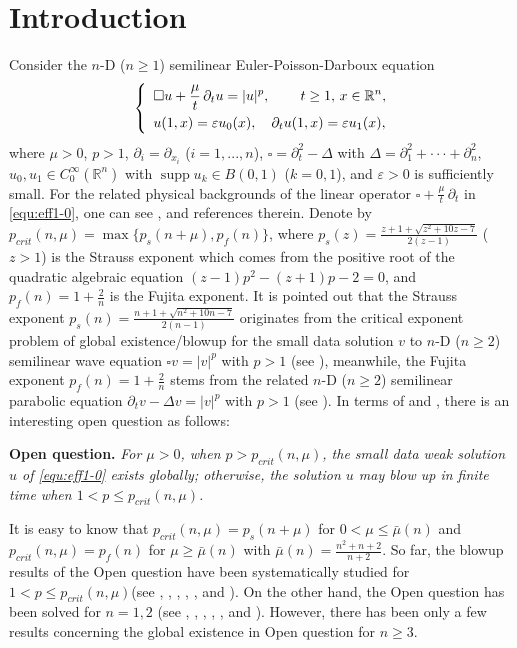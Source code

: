 \documentclass[11pt,twoside]{article}
\newcommand{\R}{\mathbb R}
\newcommand{\p}{\partial}
\newcommand{\ve}{\varepsilon}
\newcommand{\f}{\frac}
\theoremstyle{plain}
\theoremstyle{definition}
\theoremstyle{remark}
\numberwithin{equation}{section}
\begin{document}
\section{Introduction}
Consider  the $n$-D ($n\ge1$) semilinear Euler-Poisson-Darboux equation
\begin{equation}\label{equ:eff1-0}
\left\{ \enspace
\begin{aligned}
&\square u+\f{\mu}{t}\,\p_tu=|u|^p, \,\qquad t\geq1,\, x\in\Bbb R^n,\\
&u(1,x)=\ve u_0(x), \quad \partial_{t} u(1,x)=\ve u_1(x),
\end{aligned}
\right.
\end{equation}
where $\mu>0$,  $p>1$,
$\p_i=\p_{x_i}$ ($i=1, ..., n$), $\square=\partial_t^2-\Delta$ with $\Delta=\p_1^2+\cdot\cdot\cdot+\p_n^2$, $u_0, u_1\in
C_0^{\infty}(\R^n)$ with $\operatorname{supp} u_k\in B(0, 1)$  ($k=0, 1$), and $\ve>0$ is sufficiently small.
For the related physical backgrounds of the linear operator $\square +\f{\mu}{t}\,\p_t$ in \eqref{equ:eff1-0},
one can see \cite{DA-0}, \cite{LWY} and  references therein.
Denote by $p_{crit}(n,\mu)=\max\{p_s(n+\mu), p_f(n)\}$,
where  $p_s(z)=\f{z+1+\sqrt{z^2+10z-7}}{2(z-1)}$ ($z>1$)
is the Strauss exponent which comes from the positive root of the quadratic algebraic equation
$(z-1)p^2-(z+1)p-2=0$, and $p_f(n)=1+\f{2}{n}$ is the Fujita exponent.
It is pointed out that the Strauss exponent $p_s(n)=\f{n+1+\sqrt{n^2+10n-7}}{2(n-1)}$
originates from the  critical exponent problem of  global existence/blowup for the small data solution $v$ to $n$-D ($n\ge 2$)
semilinear wave equation
$\square v=|v|^p$ with $p>1$ (see \cite{Strauss}), meanwhile, the Fujita exponent $p_f(n)=1+\f{2}{n}$ stems from
the related $n$-D ($n\ge 2$) semilinear parabolic equation  $\partial_t v-\Delta v=|v|^p$ with $p>1$ (see \cite{Fuj}).
In terms of \cite{Rei1} and \cite{Imai}, there is an interesting open question as follows:

{\bf Open question.} {\it For $\mu>0$, when $p>p_{crit}(n,\mu)$, the small data weak solution $u$
of \eqref{equ:eff1-0} exists globally; otherwise, the solution $u$ may blow up in finite time when $1<p\le p_{crit}(n,\mu)$.
}

It is easy to know that $p_{crit}(n,\mu)=p_s(n+\mu)$ for $0<\mu\le\bar \mu(n)$ and
$p_{crit}(n,\mu)=p_f(n)$ for $\mu\ge\bar\mu(n)$ with $\bar\mu(n)=\frac{n^2+n+2}{n+2}$.
So far, the blowup results of the Open question have been systematically studied for $1<p\leq p_{crit}(n, \mu)$(see \cite{FLT}, \cite{IS},
\cite{LTW}, \cite{PR-0}, \cite{PR}, \cite{TL2} and \cite{W1}). On the other hand, the Open question has been solved for $n=1,2$ (see \cite{DA-0}, \cite{LWY},
\cite{HLY}, \cite{LY}, \cite{LY-1}, \cite{DA} and \cite{Rei1}).
However, there has been only a few  results concerning the global existence in Open question for
$n\ge 3$.
\end{document}

